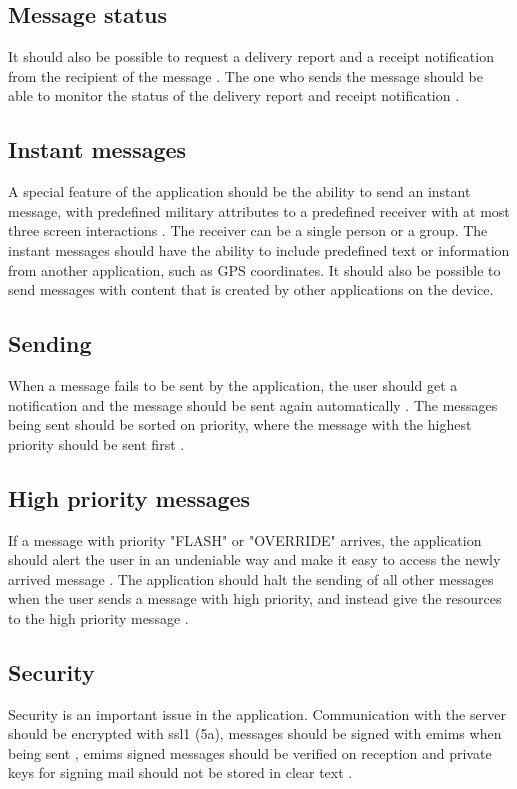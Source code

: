 \subsection{Message status}
It should also be possible to request a delivery report and a receipt notification from the recipient of the message . The one who sends the message should be able to monitor the status of the delivery report and receipt notification .

\subsection{Instant messages}
A special feature of the application should be the ability to send an instant message, with predefined military attributes to a predefined receiver with at most three screen interactions . The receiver can be a single person or a group. The instant messages should have the ability to include predefined text or information from another application, such as GPS coordinates. It should also be possible to send messages with content that is created by other applications on the device.

\subsection{Sending}
When a message fails to be sent by the application, the user should get a notification and the message should be sent again automatically . The messages being sent should be sorted on priority, where the message with the highest priority should be sent first .

\subsection{High priority messages}
If a message with priority "FLASH" or "OVERRIDE" arrives, the application should alert the user in an undeniable way and make it easy to access the newly arrived message . The application should halt the sending of all other messages when the user sends a message with high priority, and instead give the resources to the high priority message .

\subsection{Security}
Security is an important issue in the application. Communication with the server should be encrypted with \gls{ssl1} (5a), messages should be signed with \gls{emims} when being sent , \gls{emims} signed messages should be verified on reception  and private keys for signing mail should not be stored in clear text .

